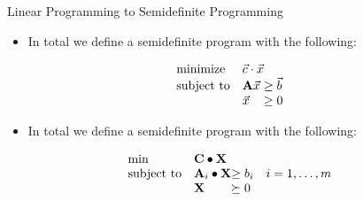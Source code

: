 \documentclass[
	11pt, %
]{beamer}
\begin{document}
\begin{frame}[label={sec:org62a97b6}]{Linear Programming to Semidefinite Programming}
\begin{itemize}
\item In total we define a semidefinite program with the following:
\end{itemize}
\begin{align*}
  \begin{array}{ll@{}ll}
    \text{minimize}   & \vec{c} \cdot \vec{x}& \\
    \text{subject to} & \mathbf{A} \vec{x} &\geq  \vec{b} \\
                      & \vec{x} &\geq 0 \\
    \end{array}
\end{align*}
\begin{itemize}
\item In total we define a semidefinite program with the following:
\end{itemize}
\begin{align*}
  \begin{array}{ll@{}ll}
  \min              & \mathbf{C} \bullet \mathbf{X}                   & \\
  \text{subject to} & \mathbf{A}_i \bullet \mathbf{X} &\geq b_i       & i=1 ,\dots, m\\
                    & \mathbf{X}                      &\succeq 0
  \end{array}
\end{align*}
\end{frame}
\end{document}
